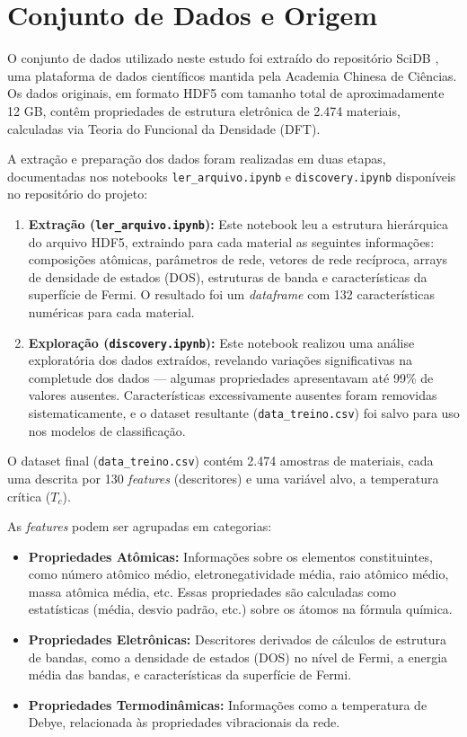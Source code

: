 \documentclass[12pt, a4paper, oneside]{report}
\begin{document}
\section{Conjunto de Dados e Origem}
\label{sec:dataset}

O conjunto de dados utilizado neste estudo foi extraído do repositório SciDB \cite{scidb2024}, uma plataforma de dados científicos mantida pela Academia Chinesa de Ciências. Os dados originais, em formato HDF5 com tamanho total de aproximadamente 12 GB, contêm propriedades de estrutura eletrônica de 2.474 materiais, calculadas via Teoria do Funcional da Densidade (DFT).

A extração e preparação dos dados foram realizadas em duas etapas, documentadas nos notebooks \texttt{ler\_arquivo.ipynb} e \texttt{discovery.ipynb} disponíveis no repositório do projeto:

\begin{enumerate}
    \item \textbf{Extração (\texttt{ler\_arquivo.ipynb}):} Este notebook leu a estrutura hierárquica do arquivo HDF5, extraindo para cada material as seguintes informações: composições atômicas, parâmetros de rede, vetores de rede recíproca, arrays de densidade de estados (DOS), estruturas de banda e características da superfície de Fermi. O resultado foi um \textit{dataframe} com 132 características numéricas para cada material.
    
    \item \textbf{Exploração (\texttt{discovery.ipynb}):} Este notebook realizou uma análise exploratória dos dados extraídos, revelando variações significativas na completude dos dados --- algumas propriedades apresentavam até 99\% de valores ausentes. Características excessivamente ausentes foram removidas sistematicamente, e o dataset resultante (\texttt{data\_treino.csv}) foi salvo para uso nos modelos de classificação.
\end{enumerate}

O dataset final (\texttt{data\_treino.csv}) contém 2.474 amostras de materiais, cada uma descrita por 130 \textit{features} (descritores) e uma variável alvo, a temperatura crítica ($T_c$).

As \textit{features} podem ser agrupadas em categorias:
\begin{itemize}
    \item \textbf{Propriedades Atômicas:} Informações sobre os elementos constituintes, como número atômico médio, eletronegatividade média, raio atômico médio, massa atômica média, etc. Essas propriedades são calculadas como estatísticas (média, desvio padrão, etc.) sobre os átomos na fórmula química.
    \item \textbf{Propriedades Eletrônicas:} Descritores derivados de cálculos de estrutura de bandas, como a densidade de estados (DOS) no nível de Fermi, a energia média das bandas, e características da superfície de Fermi.
    \item \textbf{Propriedades Termodinâmicas:} Informações como a temperatura de Debye, relacionada às propriedades vibracionais da rede.
\end{itemize}
\end{document}
